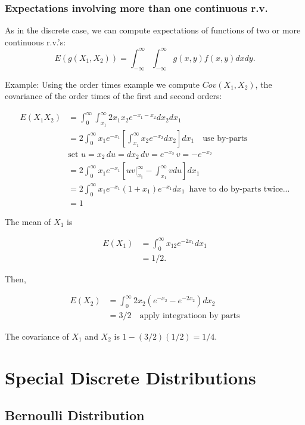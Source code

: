 \documentclass[]{book}
\begin{document}
\subsection{Expectations involving more than one continuous
r.v.}\label{expectations-involving-more-than-one-continuous-r.v.}

As in the discrete case, we can compute expectations of functions of two
or more continuous r.v.'s:
\[E(g(X_1,X_2)) = \int_{-\infty}^\infty\int_{-\infty}^\infty g(x,y)f(x,y) dxdy.\]

Example: Using the order times example we compute \(Cov(X_1, X_2)\), the
covariance of the order times of the first and second orders:

\begin{align*}
E(X_1X_2) &= \int_0^\infty \int_{x_1}^\infty 2x_1x_2e^{-x_1-x_2} dx_2 dx_1\\
& = 2\int_0^\infty x_1e^{-x_1} \left [\int_{x_1}^\infty x_2e^{-x_2}dx_2\right ] dx_1 \quad \text{use by-parts}\\
& \text{set }u=x_2\, du = dx_2\, dv = e^{-x_2}\, v = -e^{-x_2}\, \\
& = 2\int_0^\infty x_1e^{-x_1} \left [uv|_{x_1}^\infty - \int_{x_1}^\infty vdu \right] dx_1\\
& = 2\int_0^\infty x_1e^{-x_1}(1+x_1)e^{-x_1}dx_1 \, \text{ have to do by-parts twice...}\\
& = 1
\end{align*}

The mean of \(X_1\) is

\begin{align*}
E(X_1) &= \int_0^{\infty} x_12e^{-2x_1} dx_1\\
& = 1/2.
\end{align*}

Then,

\begin{align*}
E(X_2) &= \int_0^\infty 2x_2(e^{-x_2}-e^{-2x_2}) dx_2 \\
& = 3/2 \quad \text{apply integratioon by parts}
\end{align*}

The covariance of \(X_1\) and \(X_2\) is \(1 - (3/2)(1/2) =1/4\).

\chapter{Special Discrete
Distributions}\label{special-discrete-distributions}

\section{Bernoulli Distribution}\label{bernoulli-distribution}
\end{document}
